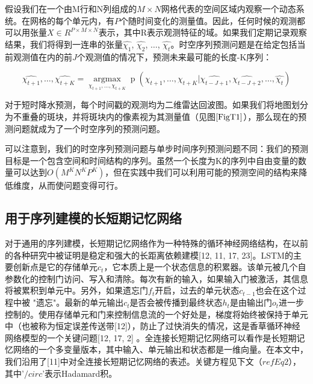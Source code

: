 \par 假设我们在一个由M行和N列组成的$M \times N$网格代表的空间区域内观察一个动态系统。在网格的每个单元内，有$P$个随时间变化的测量值。因此，任何时候的观测都可以用张量$X \in R^{P\times M\times N}$表示，其中R表示观测特征的域。如果我们定期记录观察结果，我们将得到一连串的张量$\hat{\chi _1}$, $\hat{\chi _2}$, $\dots$, $\hat{\chi _t}$。时空序列预测问题是在给定包括当前观测值在内的前$J$个观测值的情况下，预测未来最可能的长度-K序列：

\begin{equation}
  \hat{\chi _{t+1}}, \dots, \hat{\chi _{t+K}}= \mathop{argmax}\limits_{\chi _{t+1}, \dots, \chi _{t+K}} \mathop{p}(\chi _{t+1}, \dots, \chi _{t+K}|\hat{\chi _{t-J+1}}, \hat{\chi _{t-J+2}}, \dots, \hat{\chi _{t}})\label{EqT1}  
\end{equation}

\par 对于短时降水预测，每个时间戳的观测均为二维雷达回波图。如果我们将地图划分为不重叠的斑块，并将斑块内的像素视为其测量值（见图$\ref{FigT1}$），那么现在的预测问题就成为了一个时空序列的预测问题。

\par 可以注意到，我们的时空序列预测问题与单步时间序列预测问题不同：我们的预测目标是一个包含空间和时间结构的序列。虽然一个长度为K的序列中自由变量的数量可以达到$O(M^K N^K P^K)$，但在实践中我们可以利用可能的预测空间的结构来降低维度，从而使问题变得可行。

\subsection{用于序列建模的长短期记忆网络}
\par 对于通用的序列建模，长短期记忆网络作为一种特殊的循环神经网络结构，在以前的各种研究中被证明是稳定和强大的长距离依赖建模[12, 11, 17, 23]。LSTM的主要创新点是它的存储单元$c_t$，它本质上是一个状态信息的积累器。该单元被几个自参数化的控制门访问、写入和清除。每次有新的输入，如果输入门被激活，其信息将被累积到单元中。另外，如果遗忘门$f_t$开启，过去的单元状态$c_{t-1}$也会在这个过程中被 "遗忘"。最新的单元输出$c_t$是否会被传播到最终状态$h_t$是由输出门$o_t$进一步控制的。使用存储单元和门来控制信息流的一个好处是，梯度将始终被保持于单元中（也被称为恒定误差传送带[12]），防止了过快消失的情况，这是香草循环神经网络模型的一个关键问题[12, 17, 2] 。全连接长短期记忆网络可以看作是长短期记忆网络的一个多变量版本，其中输入、单元输出和状态都是一维向量。在本文中，我们沿用了[11]中对全连接长短期记忆网络的表述。关键方程见下文（$ref{Eq2}$），其中'$/circ$'表示Hadamard积。

